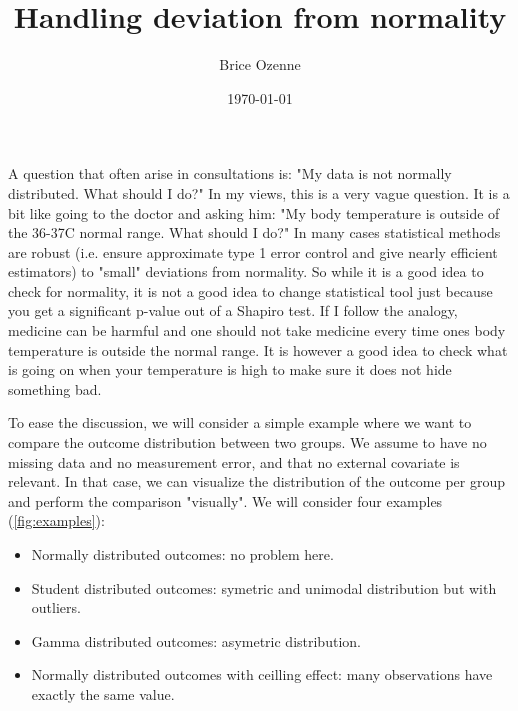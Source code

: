 \documentclass[12pt]{article}
\author{Brice Ozenne}
\date{\today}
\title{Handling deviation from normality}
\begin{document}
\maketitle
\noindent A question that often arise in consultations is: \newline
"My data is not normally distributed. What should I do?" \newline In
my views, this is a very vague question. It is a bit like going to the
doctor and asking him: \newline "My body temperature is outside of the
36-37\textdegree C normal range. What should I do?"  In many cases
statistical methods are robust (i.e. ensure approximate type 1 error
control and give nearly efficient estimators) to "small" deviations
from normality. So while it is a good idea to check for normality, it
is not a good idea to change statistical tool just because you get a
significant p-value out of a Shapiro test. If I follow the analogy,
medicine can be harmful and one should not take medicine every time
ones body temperature is outside the normal range. It is however a
good idea to check what is going on when your temperature is high to
make sure it does not hide something bad.

\bigskip

To ease the discussion, we will consider a simple example where we
want to compare the outcome distribution between two groups. We assume
to have no missing data and no measurement error, and that no external
covariate is relevant. In that case, we can visualize the distribution
of the outcome per group and perform the comparison "visually". We
will consider four examples (\autoref{fig:examples}):
\begin{itemize}
\item Normally distributed outcomes: no problem here.
\item Student distributed outcomes: symetric and unimodal distribution but with outliers.
\item Gamma distributed outcomes: asymetric distribution.
\item Normally distributed outcomes with ceilling effect: many observations have exactly the same value.
\end{itemize}


\clearpage

\vfill
\end{document}
